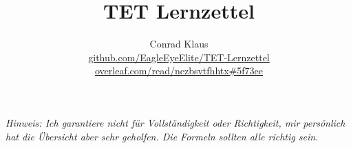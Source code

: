 \documentclass{article}
\title{TET Lernzettel}
\author{Conrad Klaus \\ 
\href{https://github.com/EagleEyeElite/TET-Lernzettel}{github.com/EagleEyeElite/TET-Lernzettel} \\
\href{https://www.overleaf.com/read/nczbsvtfhhtx\#5f73ee}{overleaf.com/read/nczbsvtfhhtx\#5f73ee}}
\date{}
\begin{document}
\maketitle

\textit{Hinweis: Ich garantiere nicht für Vollständigkeit oder Richtigkeit, mir persönlich hat die Übersicht aber sehr geholfen. Die Formeln sollten alle richtig sein.}

\vspace{0.5cm}






\end{document}
